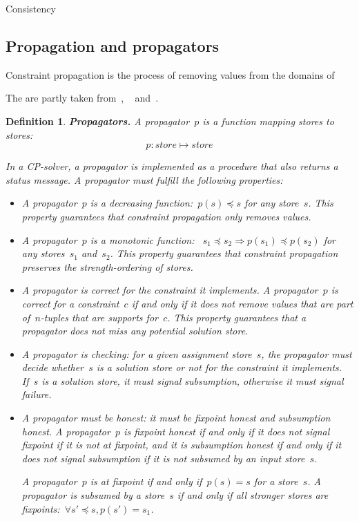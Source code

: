 \documentclass[a4paper,11pt]{article}
\newtheorem{definition}{Definition}
\newcommand{\Todo}[1]{{\color{blue}#1}}
\numberwithin{equation}{section}
\begin{document}
\Todo{Consistency}

\subsection{Propagation and propagators}

Constraint propagation is the process of removing values from the domains
of 

The are partly taken from~\cite{handbook}, ~\cite{MPG} and~\cite{article}.

\begin{definition} \label{def:prop}
  \textbf{Propagators.} A \emph{propagator}~$p$ is a function mapping stores to stores:
  \begin{equation*}
    p: store \mapsto store
  \end{equation*}

  In a CP-solver, a propagator is implemented as a procedure that also returns 
  a \emph{status message}. A propagator must fulfill the following properties:

  \begin{itemize}
  \item A propagator~$p$ is a decreasing function:~$p(s) \preceq s$ for any store~$s$.
    This property guarantees that constraint propagation only removes values.

  \item A propagator~$p$ is a monotonic function:
    ~$s_1 \preceq s_2 \Rightarrow p(s_1) \preceq p(s_2)$
    for any stores~$s_1$ and~$s_2$. This property guarantees that constraint propagation
    preserves the strength-ordering of stores.

  \item A propagator is correct for the constraint it implements.
    A propagator~$p$
    is correct for a constraint~$c$ if and only if it does not
    remove values that are part of~$n$-tuples that are supports for~$c$.
    This property guarantees that a propagator does not miss any potential 
    solution store.

  \item A propagator is \emph{checking}: for a given assignment store~$s$, the propagator
    must decide whether~$s$ is a solution store or not for the constraint it
    implements. If~$s$ is a solution store, it must signal subsumption, otherwise
    it must signal failure.

  \item A propagator must be \emph{honest}: it must be 
    \emph{fixpoint honest} and \emph{subsumption honest}. 
    A propagator~$p$ is fixpoint honest if and only if it does not signal 
    fixpoint if it is not at fixpoint, and it is subsumption honest
    if and only if it does
    not signal subsumption if it is not subsumed by an input store~$s$.
    
    A propagator~$p$ is at \emph{fixpoint} if and only if~$p(s) = s$ for
    a store~$s$. A propagator is \emph{subsumed} by a store~$s$ if and only if
    all stronger stores are fixpoints:~$\forall s' \preceq s, p(s') = s_1$.

\end{itemize}

\end{definition}
\end{document}
